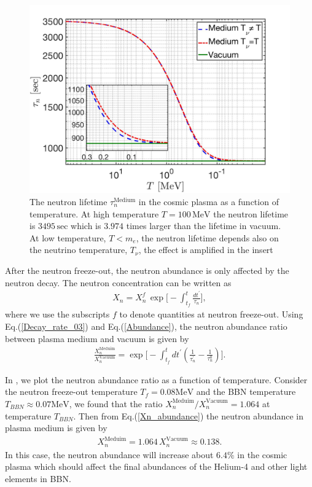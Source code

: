 \begin{figure} 
\centerline{\includegraphics[width=0.9\linewidth]{./plots/Neutron_Lifetime_001}}
\caption{The neutron lifetime $\tau_n^\mathrm{Medium}$ in the cosmic plasma as a function of temperature. At high temperature $T=100\,\mathrm{MeV}$ the neutron lifetime is $3495\,\mathrm{sec}$ which is $3.974$ times larger than the lifetime in vacuum. At low temperature, $T<m_e$, the neutron lifetime depends also on the neutrino temperature, $T_\nu$, the effect is amplified in the insert }
\label{Decay_Rate} 
\end{figure}

After the neutron freeze-out, the neutron abundance is only affected by the neutron decay. The neutron concentration can be written as 
\begin{align}
\label{Abundance}
X_n=X_n^f\,\exp\bigg[-\int^t_{t_f}\frac{dt^\prime}{\tau_n}\bigg],
\end{align}
where we use the subscripts $f$ to denote quantities at neutron freeze-out. Using Eq.(\ref{Decay_rate_03}) and Eq.(\ref{Abundance}), the neutron abundance ratio between plasma medium and vacuum is given by
\begin{align}
\label{Abundance_Ratio}
\frac{X_n^{\mathrm{Meduim}}}{X_n^{\mathrm{Vacuum}}}=\exp\bigg[-\int^t_{t_f}dt^\prime\left(\frac{1}{\tau^\prime_n}-\frac{1}{\tau^0_n}\right)\bigg].
\end{align}

In  , we plot the neutron abundance ratio as a function of temperature. Consider the neutron freeze-out temperature $T_f=0.08\mathrm{MeV}$ and the BBN temperature $T_{BBN}\approx0.07\mathrm{MeV}$, we found that the ratio ${X_n^{\mathrm{Meduim}}}/{X_n^{\mathrm{Vacuum}}}=1.064$ at temperature $T_{BBN}$. Then from Eq.(\ref{Xn_abundance}) the neutron abundance in plasma medium is given by
\begin{align}
X_n^{\mathrm{Meduim}}=1.064\,X_n^{\mathrm{Vacuum}}\approx0.138.
\end{align}
In this case, the neutron abundance will increase about $6.4\%$ in the cosmic plasma which should affect the final abundances of the Helium-4 and other light elements in BBN.
 
